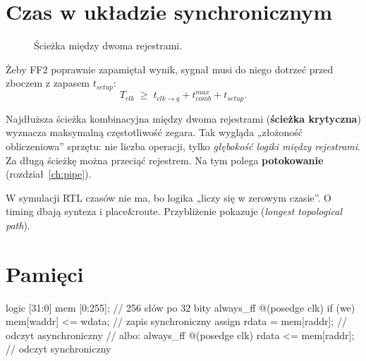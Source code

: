 \section{Czas w układzie synchronicznym}

\begin{figure}[h]
\centering
{}
\caption{Ścieżka między dwoma rejestrami.}
\label{fig:timing}
\end{figure}

Żeby FF2 poprawnie zapamiętał wynik, sygnał musi do niego dotrzeć przed
zboczem z zapasem $t_{setup}$:
\[ T_{clk} \;\geq\; t_{clk\to q} + t_{comb}^{max} + t_{setup}. \]

Najdłuższa ścieżka kombinacyjna między dwoma rejestrami (\textbf{ścieżka
krytyczna}) wyznacza maksymalną częstotliwość zegara. Tak wygląda
„złożoność obliczeniowa” sprzętu: nie liczba operacji, tylko \emph{głębokość
logiki między rejestrami}. Za długą ścieżkę można przeciąć rejestrem. Na tym
polega \textbf{potokowanie} (rozdział~\ref{ch:pipe}).

W symulacji RTL czasów nie ma, bo logika „liczy się w zerowym czasie”. O
timing dbają synteza i place\&route. Przybliżenie pokazuje 
(\emph{longest topological path}).

\section{Pamięci}

\begin{sv}
logic [31:0] mem [0:255];                       // 256 słów po 32 bity
always_ff @(posedge clk)
  if (we) mem[waddr] <= wdata;                  // zapis synchroniczny
assign rdata = mem[raddr];                      // odczyt asynchroniczny
// albo:
always_ff @(posedge clk) rdata <= mem[raddr];   // odczyt synchroniczny
\end{sv}

